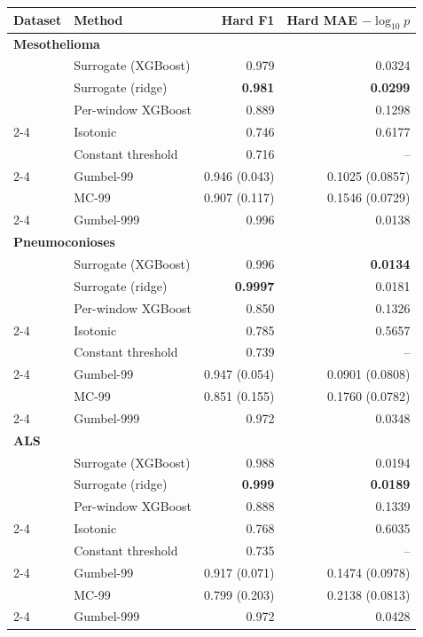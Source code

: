 \begin{tabular}{llrr}
\toprule
Dataset & Method & Hard F1 & Hard MAE $-\log_{10}p$ \\
\midrule
\multicolumn{4}{l}{\textbf{Mesothelioma}} \\
 & Surrogate (XGBoost) & 0.979 & 0.0324 \\
 & Surrogate (ridge) & \textbf{0.981} & \textbf{0.0299} \\
 & Per-window XGBoost & 0.889 & 0.1298 \\
\cmidrule(lr){2-4}
 & Isotonic & 0.746 & 0.6177 \\
 & Constant threshold & 0.716 & -- \\
\cmidrule(lr){2-4}
 & Gumbel-99 & 0.946 (0.043) & 0.1025 (0.0857) \\
 & MC-99 & 0.907 (0.117) & 0.1546 (0.0729) \\
\cmidrule(lr){2-4}
 & Gumbel-999 & 0.996 & 0.0138 \\
\midrule
\multicolumn{4}{l}{\textbf{Pneumoconioses}} \\
 & Surrogate (XGBoost) & 0.996 & \textbf{0.0134} \\
 & Surrogate (ridge) & \textbf{0.9997} & 0.0181 \\
 & Per-window XGBoost & 0.850 & 0.1326 \\
\cmidrule(lr){2-4}
 & Isotonic & 0.785 & 0.5657 \\
 & Constant threshold & 0.739 & -- \\
\cmidrule(lr){2-4}
 & Gumbel-99 & 0.947 (0.054) & 0.0901 (0.0808) \\
 & MC-99 & 0.851 (0.155) & 0.1760 (0.0782) \\
\cmidrule(lr){2-4}
 & Gumbel-999 & 0.972 & 0.0348 \\
\midrule
\multicolumn{4}{l}{\textbf{ALS}} \\
 & Surrogate (XGBoost) & 0.988 & 0.0194 \\
 & Surrogate (ridge) & \textbf{0.999} & \textbf{0.0189} \\
 & Per-window XGBoost & 0.888 & 0.1339 \\
\cmidrule(lr){2-4}
 & Isotonic & 0.768 & 0.6035 \\
 & Constant threshold & 0.735 & -- \\
\cmidrule(lr){2-4}
 & Gumbel-99 & 0.917 (0.071) & 0.1474 (0.0978) \\
 & MC-99 & 0.799 (0.203) & 0.2138 (0.0813) \\
\cmidrule(lr){2-4}
 & Gumbel-999 & 0.972 & 0.0428 \\
\bottomrule
\end{tabular}
